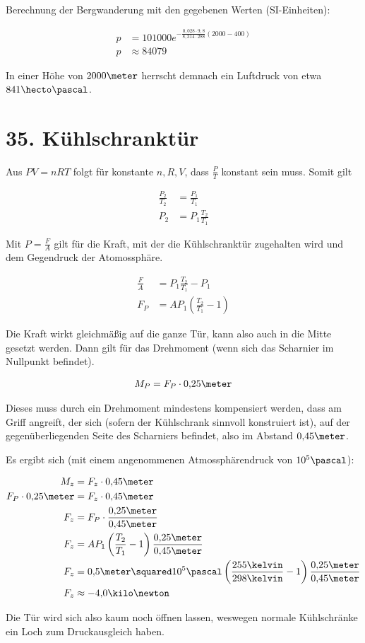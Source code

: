 \documentclass[a4paper,german,12pt,smallheadings]{scrartcl}
\begin{document}
Berechnung der Bergwanderung mit den gegebenen Werten (SI-Einheiten):

\begin{align*}
  p &= 101000 e^{-\frac{0{,}028\cdot 9{,}8}{8{,}314 \cdot 288} (2000 - 400)} \\
  p &\approx 84079
\end{align*}

In einer Höhe von $2000 \meter$ herrscht demnach ein Luftdruck von etwa $841 \hecto\pascal$.

\section*{35. Kühlschranktür}

Aus $PV = nRT$ folgt für konstante $n, R, V$, dass $\frac{P}{T}$ konstant sein muss. Somit gilt

\begin{align*}
  \frac{P_2}{T_2} &= \frac{P_1}{T_1} \\
  P_2 &= P_1 \frac{T_2}{T_1}
\end{align*}

Mit $P = \frac{F}{A}$ gilt für die Kraft, mit der die Kühlschranktür zugehalten wird und dem Gegendruck der Atomossphäre.

\begin{align*}
  \frac{F}{A} &= P_1 \frac{T_2}{T_1} - P_1 \\
  F_P &= A P_1 \left(\frac{T_2}{T_1} - 1\right)
\end{align*}

Die Kraft wirkt gleichmäßig auf die ganze Tür, kann also auch in die Mitte gesetzt werden. Dann gilt für das Drehmoment (wenn sich das Scharnier im Nullpunkt befindet).

\begin{align*}
  M_P = F_P \cdot 0{,}25 \meter
\end{align*}

Dieses muss durch ein Drehmoment mindestens kompensiert werden, dass am Griff
angreift, der sich (sofern der Kühlschrank sinnvoll konstruiert ist), auf der
gegenüberliegenden Seite des Scharniers befindet, also im Abstand $0{,}45
\meter$.

Es ergibt sich (mit einem angenommenen Atmossphärendruck von $10^5 \pascal$):

\begin{align*}
  M_z &= F_z \cdot 0{,}45 \meter \\
  F_P \cdot 0{,}25 \meter &= F_z \cdot 0{,}45 \meter \\
  F_z &= F_P \cdot \frac{0{,}25 \meter}{0{,}45 \meter} \\
  F_z &= A P_1 \left(\frac{T_2}{T_1} - 1\right) \frac{0{,}25 \meter}{0{,}45 \meter} \\
  F_z &= 0{,}5 \meter\squared 10^5 \pascal \left(\frac{255 \kelvin}{298 \kelvin} - 1\right) \frac{0{,}25 \meter}{0{,}45 \meter} \\
  F_z &\approx -4{,}0 \kilo\newton
\end{align*}

Die Tür wird sich also kaum noch öffnen lassen, weswegen normale Kühlschränke
ein Loch zum Druckausgleich haben.
\end{document}
